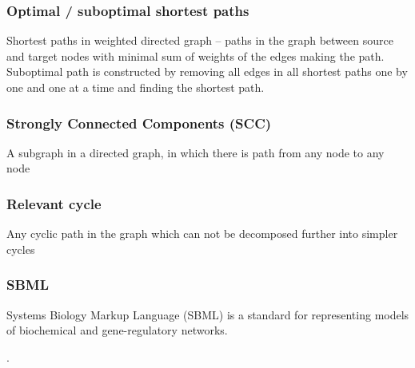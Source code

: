 \subsubsection{Optimal / suboptimal shortest paths}
Shortest paths in weighted directed graph – paths in the graph between source and target nodes with minimal sum of weights of the edges making the path. Suboptimal path is constructed by removing all edges in all shortest paths one by one and one at a time and finding the shortest path.
\subsubsection{Strongly Connected Components (SCC)}
A subgraph in a directed graph, in which there is path from any node to any node
\subsubsection{Relevant cycle}
Any cyclic path in the graph which can not be decomposed further into simpler cycles
\subsubsection{SBML}
Systems Biology Markup Language (SBML) is a standard for representing models of biochemical and gene-regulatory networks.


.